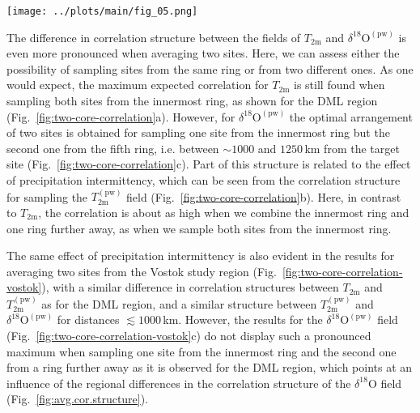 \documentclass[cp, manuscript]{copernicus}
\begin{document}
\begin{figure*}[t]%
\centering
\texttt{[image: ../plots/main/fig\_05.png]}
\caption{%
  The expected correlation with the target site temperature for the average of
  two sites in the DML region. Shown is the mean correlation of all possible
  single correlations from averaging two grid cells of (\textbf{a})
  $T_{\mathrm{2m}}$, (\textbf{b}) $T_{\mathrm{2m}}^{\mathrm{(pw)}}$ and
  (\textbf{c}) $\delta^{18}\mathrm{O}^{\mathrm{(pw)}}$ time series sampled from
  the same or from two different rings, averaged over all target sites in
  the given region. The axes display the distance from the target, where the $x$
  ($y$) axis stands for the first (second) sampled ring and tickmarks
  indicate the radius of the midpoints of the rings.}
\label{fig:two-core-correlation}%
\end{figure*}%

The difference in correlation structure between the fields of $T_{\mathrm{2m}}$
and $\delta^{18}\mathrm{O}^{\mathrm{(pw)}}$ is even more pronounced when
averaging two sites. Here, we can assess either the possibility of sampling
sites from the same ring or from two different ones. As one would expect, the
maximum expected correlation for $T_{\mathrm{2m}}$ is still found when sampling
both sites from the innermost ring, as shown for the DML region
(Fig.~\ref{fig:two-core-correlation}a). However, for
$\delta^{18}\mathrm{O}^{\mathrm{(pw)}}$ the optimal arrangement of two sites is
obtained for sampling one site from the innermost ring but the second one from
the fifth ring, i.e. between $\sim1000$ and $1250$\,km from the target site
(Fig.~\ref{fig:two-core-correlation}c). Part of this structure is related to the
effect of precipitation intermittency, which can be seen from the correlation
structure for sampling the $T_{\mathrm{2m}}^{\mathrm{(pw)}}$ field
(Fig.~\ref{fig:two-core-correlation}b). Here, in contrast to $T_{\mathrm{2m}}$,
the correlation is about as high when we combine the innermost ring and one ring
further away, as when we sample both sites from the innermost ring.

The same effect of precipitation intermittency is also evident in the results
for averaging two sites from the Vostok study region
(Fig.~\ref{fig:two-core-correlation-vostok}), with a similar difference in
correlation structures between $T_{\mathrm{2m}}$ and
$T_{\mathrm{2m}}^{\mathrm{(pw)}}$ as for the DML region, and a similar structure
between $T_{\mathrm{2m}}^{\mathrm{(pw)}}$ and
$\delta^{18}\mathrm{O}^{\mathrm{(pw)}}$ for distances $\lesssim1000$\,km.
However, the results for the $\delta^{18}\mathrm{O}^{\mathrm{(pw)}}$ field
(Fig.~\ref{fig:two-core-correlation-vostok}c) do not display such a pronounced
maximum when sampling one site from the innermost ring and the second one from a
ring further away as it is observed for the DML region, which points at an
influence of the regional differences in the correlation structure of the
$\delta^{18}\mathrm{O}$ field (Fig.~\ref{fig:avg.cor.structure}).
\end{document}
